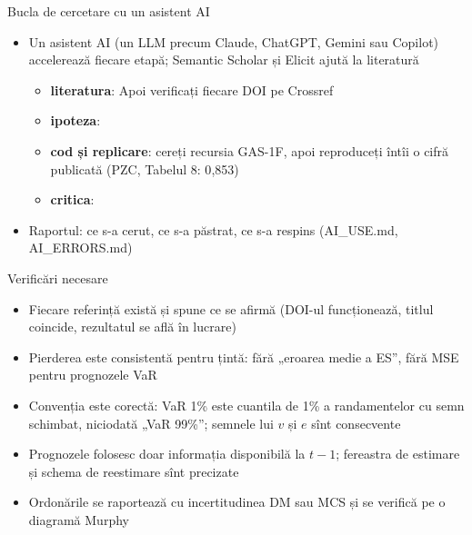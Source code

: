 \begin{frame}{Bucla de cercetare cu un asistent AI}
\itemsize{\footnotesize}
\begin{itemize}
    \item Un asistent AI (un LLM precum Claude, ChatGPT, Gemini sau Copilot) accelerează fiecare etapă; Semantic Scholar și Elicit ajută la literatură
    \begin{itemize}
        \item \textbf{literatura}:  Apoi verificați fiecare DOI pe Crossref
        \item \textbf{ipoteza}: 
        \item \textbf{cod și replicare}: cereți recursia GAS-1F, apoi reproduceți întîi o cifră publicată (PZC, Tabelul 8: 0{,}853)
        \item \textbf{critica}: 
    \end{itemize}
    \item Raportul: ce s-a cerut, ce s-a păstrat, ce s-a respins (AI\_USE.md, AI\_ERRORS.md)
\end{itemize}
\end{frame}

\begin{frame}{Verificări necesare}
\itemsize{\small}
\begin{itemize}
    \item Fiecare referință există și spune ce se afirmă (DOI-ul funcționează, titlul coincide, rezultatul se află în lucrare)
    \item Pierderea este consistentă pentru țintă: fără „eroarea medie a ES”, fără MSE pentru prognozele VaR
    \item Convenția este corectă: VaR 1\% este cuantila de 1\% a randamentelor cu semn schimbat, niciodată „VaR 99\%”; semnele lui $v$ și $e$ sînt consecvente
    \item Prognozele folosesc doar informația disponibilă la $t - 1$; fereastra de estimare și schema de reestimare sînt precizate
    \item Ordonările se raportează cu incertitudinea DM sau MCS și se verifică pe o diagramă Murphy
\end{itemize}
\end{frame}


